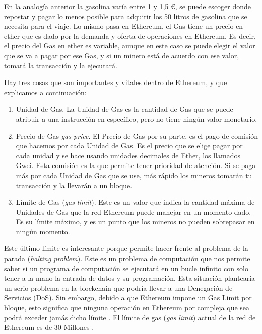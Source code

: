         En la analogía anterior la gasolina varía entre 1 y 1,5 €, se puede escoger donde repostar y pagar lo 
        menos 
        posible para adquirir los 50 litros de gasolina que se necesita para el viaje. Lo mismo pasa en 
        Ethereum, el Gas tiene un precio en ether que es dado por la demanda y oferta de operaciones en 
        Ethereum. Es decir, el precio del Gas en ether es variable, aunque en este caso se puede elegir el 
        valor que se va a pagar por ese Gas, y si un minero está de acuerdo con ese valor, tomará la 
        transacción y la ejecutará.

        Hay tres cosas que son importantes y vitales dentro de Ethereum, y que explicamos a continuación:

        \begin{enumerate}
          \item Unidad de Gas. La Unidad de Gas es la cantidad de Gas que se puede atribuir a una instrucción 
          en específico, pero no tiene ningún valor monetario.
          \item Precio de Gas \textit{gas price}. El Precio de Gas por su parte, es el pago de comisión que hacemos por cada 
          Unidad de Gas. Es el precio que se elige pagar por cada unidad y se hace usando unidades 
          decimales de Ether, los llamados Gwei. Esta comisión es la que permite tener prioridad de 
          atención. Si se paga más por cada Unidad de Gas que se use, más rápido los mineros tomarán tu 
          transacción y la llevarán a un bloque.
          \item Límite de Gas (\textit{gas limit}). Este es un valor que indica la cantidad máxima de Unidades de Gas que la red 
          Ethereum puede manejar en un momento dado. Es su límite máximo, y es un punto que los mineros no 
          pueden sobrepasar en ningún momento.
        \end{enumerate}


        Este último límite es interesante porque permite hacer frente al problema de la parada 
        (\textit{halting problem}). Este es un 
        problema de computación que nos permite saber si un programa de computación se ejecutará en un bucle 
        infinito con solo tener a la mano la entrada de datos y su programación. Esta situación plantearía un 
        serio problema en la blockchain que podría llevar a una Denegación de Servicios (DoS). Sin embargo, 
        debido a que Ethereum impone un Gas Limit por bloque, esto significa que ninguna operación en 
        Ethereum por compleja que sea podrá exceder jamás dicho límite \parencite{bit2meacademy}. El límite 
        de gas (\textit{gas limit}) actual de la red de Ethereum es de 30 Millones \parencite{ycharts}.



